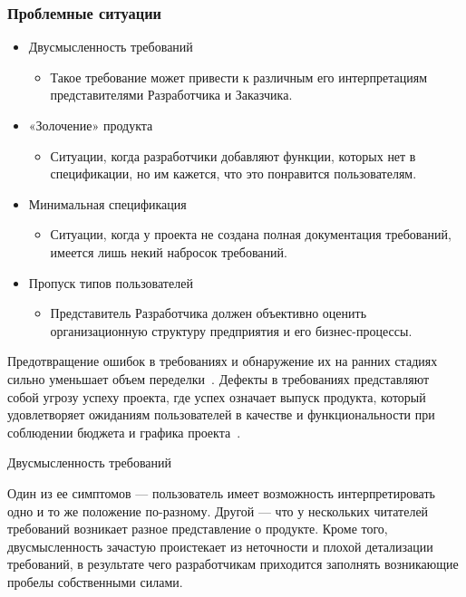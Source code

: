 \documentclass{../industrial-development}
\begin{document}
{%
\begin{frame} \frametitle {Проблемные ситуации}
\begin{itemize}
\item \alert{Двусмысленность требований}
\begin{itemize}
\item Такое требование может привести к различным его интерпретациям представителями Разработчика и Заказчика.
\end{itemize}
\item \alert{«Золочение» продукта}
\begin{itemize}
\item Ситуации, когда разработчики добавляют
функции, которых нет в спецификации, но им кажется, что это понравится пользователям.
\end{itemize}
\item \alert{Минимальная спецификация}
\begin{itemize}
\item Ситуации, когда у проекта не создана полная документация требований, имеется лишь некий набросок требований.
\end{itemize}
\item \alert{Пропуск типов пользователей}
\begin{itemize}
\item Представитель Разработчика должен объективно оценить организационную структуру предприятия и его бизнес-процессы.
\end{itemize}
\end{itemize}
\end{frame}

\lecturenotes

Предотвращение ошибок в требованиях и обнаружение их на ранних стадиях сильно уменьшает объем переделки~\cite[с.~16]{Wiegers}. Дефекты в требованиях представляют собой угрозу успеху проекта, где успех означает выпуск продукта, который удовлетворяет ожиданиям пользователей в качестве и функциональности при соблюдении бюджета и графика проекта~\cite[с.~17]{Wiegers}.

\alert{Двусмысленность требований}

Один из ее симптомов — пользователь имеет возможность интерпретировать одно и то же положение по-разному. Другой — что у нескольких читателей требований возникает разное
представление о продукте. Кроме того, двусмысленность зачастую
проистекает из неточности и плохой детализации требований, в результате чего разработчикам приходится заполнять возникающие
пробелы собственными силами.

}
\end{document}
